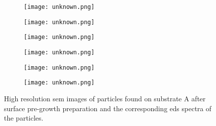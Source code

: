 \begin{figure}
    \centering
    \begin{subfigure}[t]{\textwidth}
          \begin{minipage}[t]{0.49\linewidth}
            \centering
            \texttt{[image: unknown.png]}
          \end{minipage}
          \hspace{0.02\linewidth}
          \begin{minipage}[t]{0.49\linewidth}
            \centering
            \texttt{[image: unknown.png]}
          \end{minipage}
        \caption{}\label{fig:add_label}
    \end{subfigure}
    \par\bigskip
    \begin{subfigure}[t]{\textwidth}
          \begin{minipage}[t]{0.49\linewidth}
            \centering
            \texttt{[image: unknown.png]}
          \end{minipage}
          \hspace{0.02\linewidth}
          \begin{minipage}[t]{0.49\linewidth}
            \centering
            \texttt{[image: unknown.png]}
          \end{minipage}
        \caption{}\label{fig:add_label}
    \end{subfigure}
    \par\bigskip
    \begin{subfigure}[t]{\textwidth}
          \begin{minipage}[t]{0.49\linewidth}
            \centering
            \texttt{[image: unknown.png]}
          \end{minipage}
          \hspace{0.02\linewidth}
          \begin{minipage}[t]{0.49\linewidth}
            \centering
            \texttt{[image: unknown.png]}
          \end{minipage}
        \caption{}\label{fig:add_label}
    \end{subfigure}
    \caption[\Ac{sem} images and \ac{eds} spectra of particles found on substrate A after surface pre-growth preparation.]{High resolution \acf{sem} images of particles found on substrate A after surface pre-growth preparation and the corresponding \acf{eds} spectra of the particles.}\label{fig:subAb_sem_w_eds}
\end{figure}

